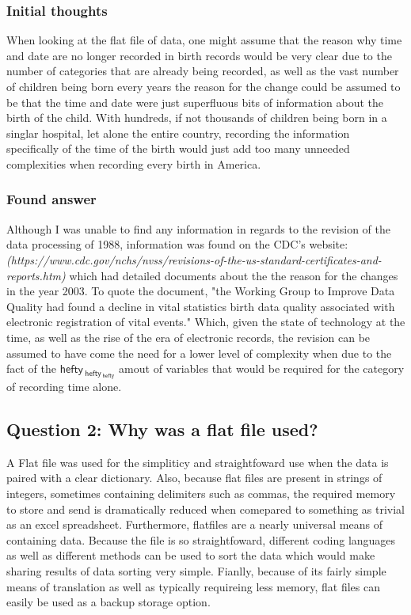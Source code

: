 \documentclass[10pt]{article}
\begin{document}
\subsubsection{Initial thoughts}
When looking at the flat file of data, one might assume that the reason why time and date are no longer recorded in birth
records would be very clear due to the number of categories that are already being recorded, as well as the vast number of children being born every years
the reason for the change could be assumed to be that the time and date were just superfluous bits of information about the birth of the child. With hundreds, if not thousands of children 
being born in a singlar hospital, let alone the entire country, recording the information specifically of the time of the birth would just add too many 
unneeded complexities when recording every birth in America.
\subsubsection{Found answer}
Although I was unable to find any information in regards to the revision of the data processing of 1988, information was found on the CDC's website:
\emph{(https://www.cdc.gov/nchs/nvss/revisions-of-the-us-standard-certificates-and-reports.htm)} which had detailed documents about the the reason for the changes
in the year 2003. To quote the document, "the Working Group to Improve Data Quality had found a decline in vital statistics birth data quality associated
with electronic registration of vital events." Which, given the state of technology at the time, as well as the rise of the era of electronic records, the revision can
be assumed to have come the need for a lower level of complexity when due to the fact of the $\mathsf{hefty}\,_{\mathsf{hefty}\,_{\mathsf{hefty}}}$ amout of variables
that would be required for the category of recording time alone.
\subsection{Question 2: Why was a flat file used?}
A Flat file was used for the simpliticy and straightfoward use when the data is paired with a clear dictionary. Also, because flat files are present in strings of integers,
sometimes containing delimiters such as commas, the required memory to store and send is dramatically reduced when comepared to something as trivial as an excel spreadsheet.
Furthermore, flatfiles are a nearly universal means of containing data. Because the file is so straightfoward, different coding languages as well as different methods can 
be used to sort the data which would make sharing results of data sorting very simple. Fianlly, because of its fairly simple means of translation as well as typically requireing
less memory, flat files can easily be used as a backup storage option.
\end{document}
